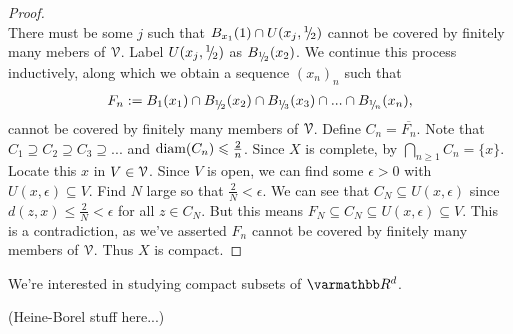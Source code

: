 \begin{proof}
\begin{equation*}
                \end{equation*}
            There must be some $j$ such that $B_{x_1}(1) \cap U(x_j,{}^{1}\mskip -5mu/\mskip -3mu_{2})$ cannot be covered by finitely many mebers of $\mathcal{V}$. Label $U(x_j,{}^{1}\mskip -5mu/\mskip -3mu_{2})$ as $B_{{}^{1}\mskip -5mu/\mskip -3mu_{2}}(x_2)$. We continue this process inductively, along which we obtain a sequence $(x_n)_n$ such that
                \begin{equation*}
                \begin{split}
                    F_n := B_{1}(x_1) \cap B_{{}^{1}\mskip -5mu/\mskip -3mu_{2}}(x_2) \cap B_{{}^{1}\mskip -5mu/\mskip -3mu_{3}}(x_3) \cap ... \cap B_{{}^{1}\mskip -5mu/\mskip -3mu_{n}}(x_n),
                \end{split}
                \end{equation*}
            cannot be covered by finitely many members of $\mathcal{V}$. Define $C_n = \overline{F_n}$. Note that $C_1 \supseteq C_2 \supseteq C_3 \supseteq...$ and $\operatorname{diam}(C_n) \leqslant \frac{2}{n}$. Since $X$ is complete, by  $\bigcap_{n \geq 1}C_n = \{x\}$. Locate this $x$ in $V \in \mathcal{V}$. Since $V$ is open, we can find some $\epsilon > 0$ with $U(x,\epsilon) \subseteq V$. Find $N$ large so that $\frac{2}{N} < \epsilon$. We can see that $C_N \subseteq U(x,\epsilon)$ since $d(z,x) \leq \frac{2}{N} < \epsilon$ for all $z \in C_N$. But this means $F_N \subseteq C_N \subseteq U(x,\epsilon) \subseteq V$. This is a contradiction, as we've asserted $F_n$ cannot be covered by finitely many members of $\mathcal{V}$. Thus $X$ is compact.
        \end{proof}

    \begin{center}
    \end{center}

    We're interested in studying compact subsets of $\bfR^d$.

    (Heine-Borel stuff here...)

    \begin{center}
    \end{center}

